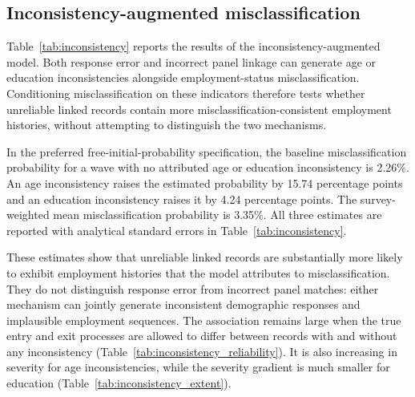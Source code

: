 \subsection{Inconsistency-augmented misclassification}\label{subsec:results:inconsistency}

Table~\ref{tab:inconsistency} reports the results of the inconsistency-augmented
model. Both response error and incorrect panel linkage can generate age or
education inconsistencies alongside employment-status misclassification.
Conditioning misclassification on these indicators therefore tests whether
unreliable linked records contain more misclassification-consistent employment
histories, without attempting to distinguish the two mechanisms.

In the preferred free-initial-probability specification, the baseline
misclassification probability for a wave with no attributed age or education
inconsistency is 2.26\%. An age inconsistency raises the estimated probability
by 15.74 percentage points and an education inconsistency raises it by 4.24
percentage points. The survey-weighted mean misclassification probability is
3.35\%. All three estimates are reported with analytical standard errors in
Table~\ref{tab:inconsistency}.

These estimates show that unreliable linked records are substantially more
likely to exhibit employment histories that the model attributes to
misclassification. They do not distinguish response error from incorrect panel
matches: either mechanism can jointly generate inconsistent demographic
responses and implausible employment sequences. The association remains large
when the true entry and exit processes are allowed to differ between records
with and without any inconsistency (Table~\ref{tab:inconsistency_reliability}).
It is also increasing in severity for age inconsistencies, while the severity
gradient is much smaller for education (Table~\ref{tab:inconsistency_extent}).
